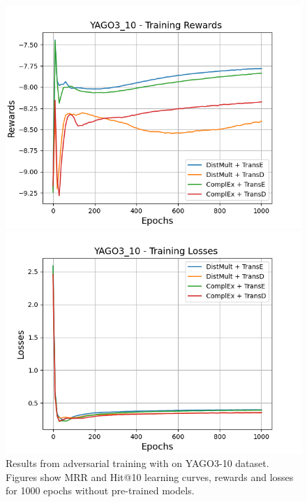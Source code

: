 \begin{figure}[H]
    \begin{minipage}{.45\textwidth}
      \centering
      \includegraphics[width=0.9\linewidth]{figures/results/gan_train/not_pretrained/random/yago3_10/1k_epochs/random_yago3_10_rew.png}
    \end{minipage}%
     \begin{minipage}{.45\textwidth}
      \centering
      \includegraphics[width=0.9\linewidth]{figures/results/gan_train/not_pretrained/random/yago3_10/1k_epochs/random_yago3_10_losses.png}
    \end{minipage}%
    \caption{Results from adversarial training with \origsampling on \textsc{YAGO3-10} dataset.
    Figures show MRR and Hit@10 learning curves, rewards and losses for 1000 epochs without pre-trained models.}
    \label{fig:gan_train_not_pretrained_random_yago3_10}
\end{figure}